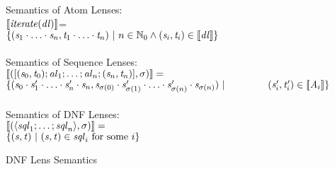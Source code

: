 \begin{figure}
Semantics of Atom Lenses:\\
$[ \! [\mathit{iterate(\mathit{dl})}] \! ]$=\\
\hspace*{3em}$\{(\mathit{s}_1\cdot\ldots\cdot\mathit{s}_n,
\mathit{t}_1\cdot\ldots\cdot\mathit{t}_n)~|~
n\in\mathbb{N}_0\wedge(\mathit{s}_i,\mathit{t}_i)\in[ \! [\mathit{dl}] \! ]\}$\\
\\
Semantics of Sequence Lenses:\\
$[ \! [([(\mathit{s}_0,\mathit{t}_0);
\mathit{al}_1;\ldots;\mathit{al}_n
;(\mathit{s}_n,\mathit{t}_n)],\sigma)] \! ]=$\\
\hspace*{3em}$\SetOf{
(\String_0\Concat\String_1'\Concat\ldots\Concat\String_n'\Concat\String_n,
\String_{\Permutation(0)}\Concat\String_{\Permutation(1)}'\Concat\ldots
\Concat\String_{\Permutation(n)}'\Concat\String_{\Permutation(n)})\SuchThat$\\
\hspace*{4em}$(\String_i',\StringAlt_i')\in\SemanticsOf{\Atom_i}}$\\
\\
Semantics of DNF Lenses:\\
$[ \! [(\langle\mathit{sql}_1;\ldots;
\mathit{sql}_n\rangle,\sigma)] \! ]=$\\
\hspace*{3em}$\{(\mathit{s},\mathit{t})~|~
(\mathit{s},\mathit{t})\in\mathit{sql}_i\text{ for some $i$}\}$
\caption{DNF Lens Semantics}
\label{fig:dnf-lens-semantics}
\end{figure}

